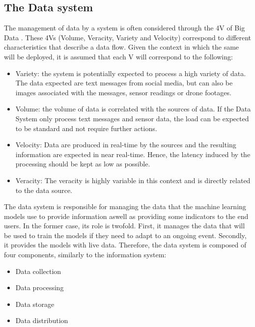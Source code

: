 \subsection{The Data system}
The management of data by a system is often considered through the 4V of Big Data \parencite{kalyvasBigDataPrimer2014}.
These 4Vs (Volume, Veracity, Variety and Velocity) correspond to different characteristics that describe a data flow.
Given the context in which the same will be deployed, it is assumed that each V will correspond to the following:

\begin{itemize}
    \item Variety: the system is potentially expected to process a high variety of data.
          The data expected are text messages from social media, but can also be images associated with the messages, sensor readings or drone footages.
    \item Volume: the volume of data is correlated with the sources of data.
          If the Data System only process text messages and sensor data, the load can be expected to be standard and not require further actions.
    \item Velocity: Data are produced in real-time by the sources and the resulting information are expected in near real-time.
          Hence, the latency induced by the processing should be kept as low as possible.
    \item Veracity: The veracity is highly variable in this context and is directly related to the data source.
\end{itemize}

The data system is responsible for managing the data that the machine learning models use to provide information aswell as providing some indicators to the end users.
In the former case, its role is twofold.
First, it manages the data that will be used to train the models if they need to adapt to an ongoing event.
Secondly, it provides the models with live data.
Therefore, the data system is composed of four components, similarly to the information system:

\begin{itemize}
    \item Data collection
    \item Data processing
    \item Data storage
    \item Data distribution
\end{itemize}

